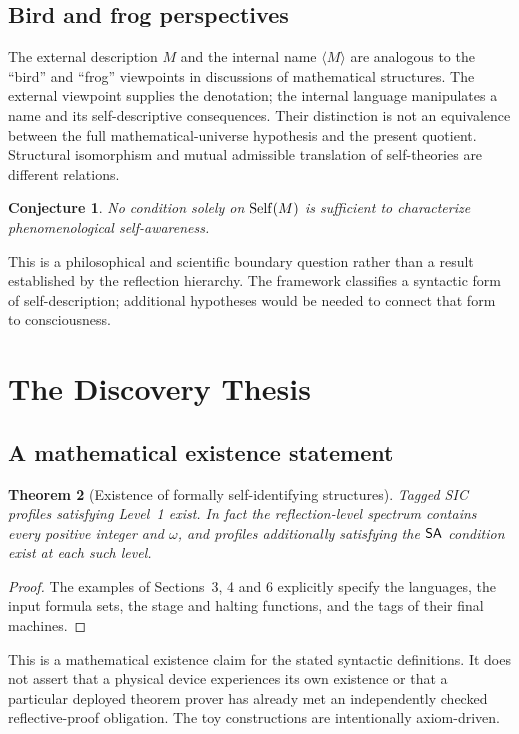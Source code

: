 \documentclass[11pt,letterpaper]{article}
\newtheorem{theorem}{Theorem}[section]\newtheorem{proposition}[theorem]{Proposition}\newtheorem{lemma}[theorem]{Lemma}\newtheorem{corollary}[theorem]{Corollary}\newtheorem{conjecture}[theorem]{Conjecture}\theoremstyle{definition}\newtheorem{definition}[theorem]{Definition}\newtheorem{example}[theorem]{Example}\newtheorem{remark}[theorem]{Remark}
\begin{document}
\subsection{Bird and frog perspectives}
The external description $M$ and the internal name $\langle M\rangle$ are analogous to the ``bird'' and ``frog'' viewpoints in discussions of mathematical structures. The external viewpoint supplies the denotation; the internal language manipulates a name and its self-descriptive consequences. Their distinction is not an equivalence between the full mathematical-universe hypothesis and the present quotient. Structural isomorphism and mutual admissible translation of self-theories are different relations.

\begin{conjecture}
No condition solely on $\operatorname{Self}(M)$ is sufficient to characterize phenomenological self-awareness.
\end{conjecture}
This is a philosophical and scientific boundary question rather than a result established by the reflection hierarchy. The framework classifies a syntactic form of self-description; additional hypotheses would be needed to connect that form to consciousness.

\section{The Discovery Thesis}\label{sec:discovery}
\subsection{A mathematical existence statement}
\begin{theorem}[Existence of formally self-identifying structures]
Tagged SIC profiles satisfying Level~1 exist. In fact the reflection-level spectrum contains every positive integer and $\omega$, and profiles additionally satisfying the $\mathsf{SA}$ condition exist at each such level.
\end{theorem}
\begin{proof}
The examples of Sections~3, 4 and 6 explicitly specify the languages, the input formula sets, the stage and halting functions, and the tags of their final machines.
\end{proof}
This is a mathematical existence claim for the stated syntactic definitions. It does not assert that a physical device experiences its own existence or that a particular deployed theorem prover has already met an independently checked reflective-proof obligation. The toy constructions are intentionally axiom-driven.
\end{document}
